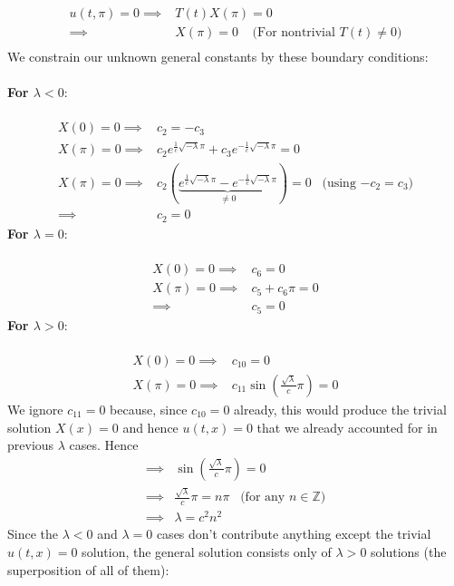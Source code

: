 \documentclass[12pt]{article}
\begin{document}
{\begin{align*}
u(t,\pi) = 0 \implies& T(t)X(\pi) = 0 \\
\implies& X(\pi) = 0 \;\;\;\; \text{(For nontrivial $T(t) \neq 0$)} \\
\end{align*}
We constrain our unknown general constants by these boundary conditions: \\ \\
\textbf{For $\lambda < 0$}: \\ \\
\begin{align*}
X(0) = 0 \implies& \boxed{c_2 = -c_3} \\
X(\pi) = 0 \implies& c_2 e^{\frac{1}{c} \sqrt{-\lambda} \pi} + c_3 e^{-\frac{1}{c} \sqrt{-\lambda} \pi} = 0 \\
X(\pi) = 0 \implies& c_2 \left( \underbrace{ e^{\frac{1}{c} \sqrt{-\lambda} \pi} - e^{-\frac{1}{c} \sqrt{-\lambda} \pi}}_{\neq 0} \right) = 0 \;\;\; \text{(using $-c_2 = c_3$)} \\
\implies& \boxed{c_2 = 0}
\end{align*}
\textbf{For $\lambda = 0$}: \\ \\
\begin{align*}
X(0) = 0 \implies& \boxed{c_6 = 0} \\
X(\pi) = 0 \implies& c_5 + c_6 \pi = 0 \\
\implies& \boxed{c_5 = 0}
\end{align*}
\textbf{For $\lambda > 0$}: \\ \\
\begin{align*}
X(0) = 0 \implies& \boxed{c_{10} = 0}\\
X(\pi) = 0 \implies& c_{11} \sin \left( \frac{\sqrt{\lambda}}{c} \pi \right) = 0
\end{align*}
We ignore $c_{11} = 0$ because, since $c_{10} =0$ already, this would produce the trivial solution $X(x) = 0$ and hence $u(t,x) = 0$ that we already accounted for in previous $\lambda$ cases. Hence
\begin{align*}
\implies& \sin \left( \frac{\sqrt{\lambda}}{c} \pi \right) = 0 \\
\implies& \frac{\sqrt{\lambda}}{c} \pi = n\pi \;\;\; \text{(for any $n \in \mathbb{Z}$)} \\
\implies& \lambda = c^2n^2
\end{align*}
Since the $\lambda < 0$ and $\lambda = 0$ cases don't contribute anything except the trivial $u(t,x) = 0$ solution, the general solution consists only of $\lambda > 0$ solutions (the superposition of all of them):
}
\end{document}
